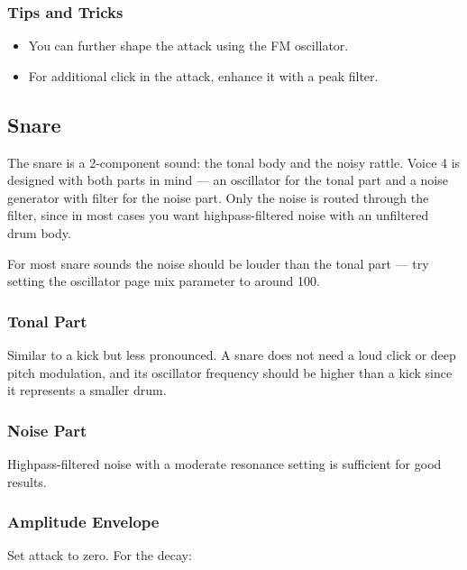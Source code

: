 \subsubsection{Tips and Tricks}\label{tips-and-tricks}

\begin{itemize}
\tightlist
\item
  You can further shape the attack using the FM oscillator.
\item
  For additional click in the attack, enhance it with a peak filter.
\end{itemize}

\subsection{Snare}\label{snare}

The snare is a 2-component sound: the tonal body and the noisy rattle.
Voice 4 is designed with both parts in mind --- an oscillator for the
tonal part and a noise generator with filter for the noise part. Only
the noise is routed through the filter, since in most cases you want
highpass-filtered noise with an unfiltered drum body.

For most snare sounds the noise should be louder than the tonal part ---
try setting the oscillator page mix parameter to around 100.

\subsubsection{Tonal Part}\label{tonal-part}

Similar to a kick but less pronounced. A snare does not need a loud
click or deep pitch modulation, and its oscillator frequency should be
higher than a kick since it represents a smaller drum.

\subsubsection{Noise Part}\label{noise-part}

Highpass-filtered noise with a moderate resonance setting is sufficient
for good results.

\subsubsection{Amplitude Envelope}\label{amplitude-envelope-1}

Set attack to zero. For the decay:

